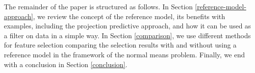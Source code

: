 \documentclass[american,]{article}
\theoremstyle{definition}
\begin{document}
The remainder of the paper is structured as follows. In Section \ref{reference-model-approach}, we review the concept of the reference model, its benefits with examples, including the projection predictive approach, and how it can be used as a filter on data in a simple way. In Section \ref{comparison}, we use different methods for feature selection comparing the selection results with and without using a reference model in the framework of the normal means problem. Finally, we end with a conclusion in Section \ref{conclusion}.



\end{document}
